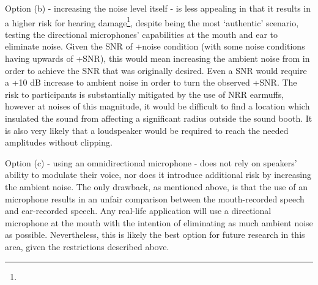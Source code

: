\DIFdelend Option (b) - increasing the noise level itself - is less appealing in that it results in a higher risk for hearing damage\DIFaddbegin \footnote{}\DIFaddend , despite being the most `authentic' scenario, \DIFaddbegin {}\DIFaddend testing the directional microphones' capabilities at the mouth and ear to eliminate noise.  Given the SNR of +\DIFdelbegin {}\DIFdelend \DIFaddbegin {}\DIFaddend noise condition (with some \DIFdelbegin {}\DIFdelend \DIFaddbegin {}\DIFaddend noise conditions having upwards of +\DIFdelbegin {}\DIFdelend \DIFaddbegin {}\DIFaddend SNR), this would mean increasing the ambient noise from \DIFdelbegin {}\DIFdelend \DIFaddbegin {}\DIFaddend in order to achieve the \DIFdelbegin {}\DIFdelend \DIFaddbegin {}\DIFaddend SNR that was originally desired.  Even a \DIFdelbegin {}\DIFdelend \DIFaddbegin {}\DIFaddend SNR would require a +10 dB increase to \DIFdelbegin {}\DIFdelend \DIFaddbegin {}\DIFaddend ambient noise in order to turn the observed \DIFaddbegin {}\DIFaddend +\DIFdelbegin {}\DIFdelend \DIFaddbegin {}\DIFaddend SNR. The risk to participants is substantially mitigated by the use of \DIFdelbegin {}\DIFdelend \DIFaddbegin {}\DIFaddend NRR   earmuffs, however at noises of this magnitude, it would be difficult to find a location which insulated the sound from affecting a significant radius outside the sound booth.  It is also very likely that a \DIFdelbegin {}\DIFdelend \DIFaddbegin {}\DIFaddend loudspeaker would be required to reach the needed amplitudes without clipping.

Option (c) - using an omnidirectional microphone - does not rely on speakers' ability to modulate their voice, nor does it introduce additional risk by increasing the ambient noise.  The only drawback, as mentioned above, is that the use of an \DIFdelbegin {}\DIFdelend \DIFaddbegin {}\DIFaddend microphone results in an unfair comparison between the mouth-recorded speech and ear-recorded speech.  Any real-life application will use a directional microphone at the mouth with the intention of eliminating as much ambient noise as possible.  Nevertheless, this is likely the best option for future research in this area, given the restrictions described above.

